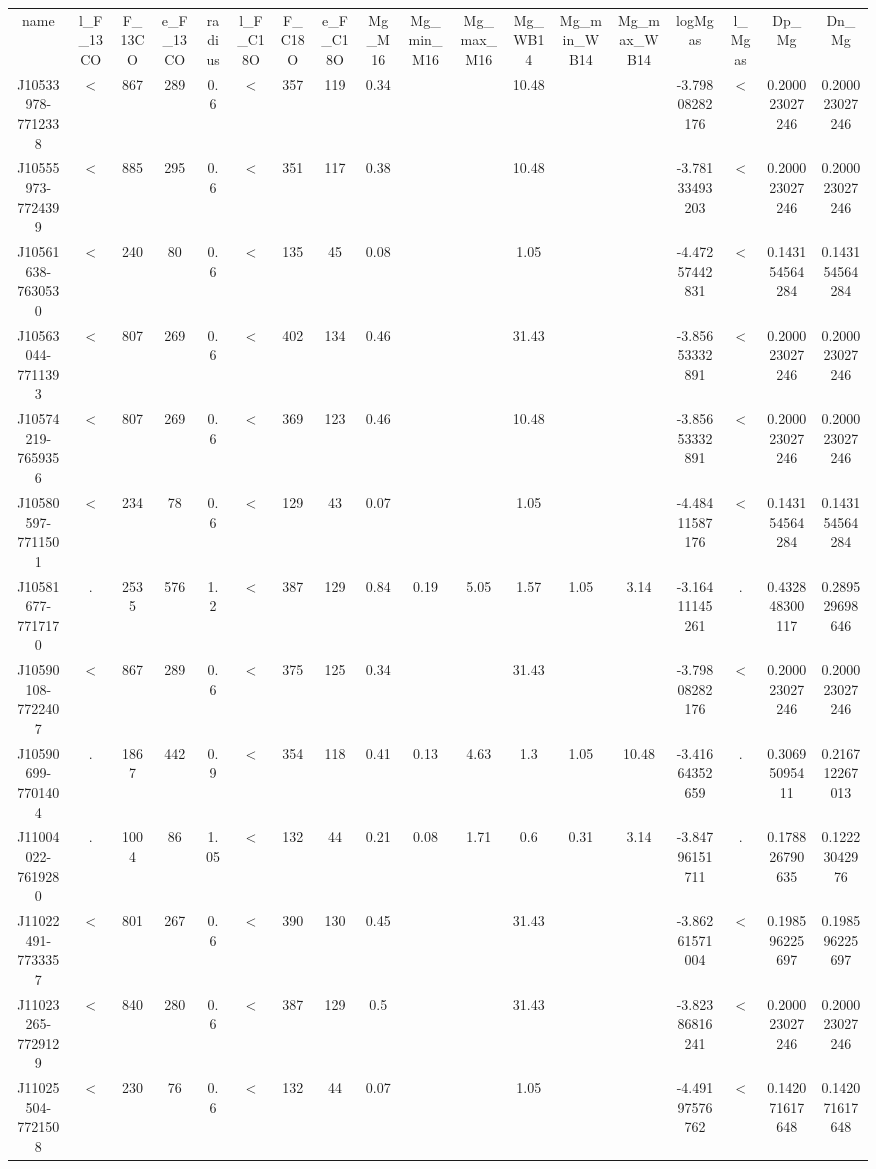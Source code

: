 \begin{table}
\begin{tabular}{cccccccccccccccccc}
name & l_F_13CO & F_13CO & e_F_13CO & radius & l_F_C18O & F_C18O & e_F_C18O & Mg_M16 & Mg_min_M16 & Mg_max_M16 & Mg_WB14 & Mg_min_WB14 & Mg_max_WB14 & logMgas & l_Mgas & Dp_Mg & Dn_Mg \\
J10533978-7712338 & < & 867 & 289 & 0.6 & < & 357 & 119 & 0.34 &  &  & 10.48 &  &  & -3.79808282176 & < & 0.200023027246 & 0.200023027246 \\
J10555973-7724399 & < & 885 & 295 & 0.6 & < & 351 & 117 & 0.38 &  &  & 10.48 &  &  & -3.78133493203 & < & 0.200023027246 & 0.200023027246 \\
J10561638-7630530 & < & 240 & 80 & 0.6 & < & 135 & 45 & 0.08 &  &  & 1.05 &  &  & -4.47257442831 & < & 0.143154564284 & 0.143154564284 \\
J10563044-7711393 & < & 807 & 269 & 0.6 & < & 402 & 134 & 0.46 &  &  & 31.43 &  &  & -3.85653332891 & < & 0.200023027246 & 0.200023027246 \\
J10574219-7659356 & < & 807 & 269 & 0.6 & < & 369 & 123 & 0.46 &  &  & 10.48 &  &  & -3.85653332891 & < & 0.200023027246 & 0.200023027246 \\
J10580597-7711501 & < & 234 & 78 & 0.6 & < & 129 & 43 & 0.07 &  &  & 1.05 &  &  & -4.48411587176 & < & 0.143154564284 & 0.143154564284 \\
J10581677-7717170 & . & 2535 & 576 & 1.2 & < & 387 & 129 & 0.84 & 0.19 & 5.05 & 1.57 & 1.05 & 3.14 & -3.16411145261 & . & 0.432848300117 & 0.289529698646 \\
J10590108-7722407 & < & 867 & 289 & 0.6 & < & 375 & 125 & 0.34 &  &  & 31.43 &  &  & -3.79808282176 & < & 0.200023027246 & 0.200023027246 \\
J10590699-7701404 & . & 1867 & 442 & 0.9 & < & 354 & 118 & 0.41 & 0.13 & 4.63 & 1.3 & 1.05 & 10.48 & -3.41664352659 & . & 0.30695095411 & 0.216712267013 \\
J11004022-7619280 & . & 1004 & 86 & 1.05 & < & 132 & 44 & 0.21 & 0.08 & 1.71 & 0.6 & 0.31 & 3.14 & -3.84796151711 & . & 0.178826790635 & 0.12223042976 \\
J11022491-7733357 & < & 801 & 267 & 0.6 & < & 390 & 130 & 0.45 &  &  & 31.43 &  &  & -3.86261571004 & < & 0.198596225697 & 0.198596225697 \\
J11023265-7729129 & < & 840 & 280 & 0.6 & < & 387 & 129 & 0.5 &  &  & 31.43 &  &  & -3.82386816241 & < & 0.200023027246 & 0.200023027246 \\
J11025504-7721508 & < & 230 & 76 & 0.6 & < & 132 & 44 & 0.07 &  &  & 1.05 &  &  & -4.49197576762 & < & 0.142071617648 & 0.142071617648 \\

\end{tabular}
\end{table}
